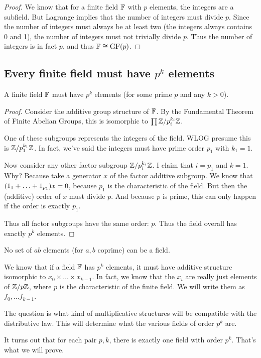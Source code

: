 \begin{proof}
  We know that for a finite field $\mathbb{F}$ with $p$ elements, the
  integers are a subfield. But Lagrange implies that the number of
  integers must divide $p$. Since the number of integers must always be
  at least two (the integers always contains 0 and 1), the number of
  integers must not trivially divide $p$. Thus the number of integers is
  in fact $p$, and thus $\mathbb{F} \cong \operatorname{GF}\mathopen{}\left( {p} \right)\mathclose{}$.
\end{proof}

\subsection{Every finite field must have $p^k$ elements}

\begin{theorem}
  A finite field $\mathbb{F}$ must have $p^k$ elements (for some prime $p$ and
  any $k > 0$).
\end{theorem}

\begin{proof}
  Consider the additive group structure of $\mathbb{F}$. By the Fundamental
  Theorem of Finite Abelian Groups, this is isomorphic to $\prod
  \mathbb{Z} / p_i^{k_i}\mathbb{Z}$.

  One of these subgroups represents the integers of the field. WLOG
  presume this is $\mathbb{Z} / p_1^{k_1}\mathbb{Z}$. In fact, we've said the integers
  must have prime order $p_1$ with $k_1 = 1$.

  Now consider any other factor subgroup $\mathbb{Z} / p_i^{k_i}\mathbb{Z}$. I claim
  that $i = p_1$ and $k = 1$. Why? Because take a generator $x$ of the
  factor additive subgroup. We know that $\mathopen{}\left( {1_1 + \ldots +
  1_{p_1}} \right)\mathclose{} x = 0$, because $p_1$ is the characteristic of the field. But
  then the (additive) order of $x$ must divide $p$. And because $p$ is
  prime, this can only happen if the order is exactly $p_1$.

  Thus all factor subgroups have the same order: $p$. Thus the field
  overall has exactly $p^k$ elements.
\end{proof}

\begin{corollary}
  No set of $ab$ elements (for $a, b$ coprime) can be a field.
\end{corollary}

\begin{remark}
  We know that if a field $\mathbb{F}$ has $p^k$ elements, it must have additive
  structure isomorphic to $x_0 \times \ldots \times x_{k-1}$. In fact,
  we know that the $x_i$ are really just elements of $\mathbb{Z} / p\mathbb{Z}$, where $p$
  is the characteristic of the finite field. We will write them as $f_0,
  \ldots f_{k-1}$.

  The question is what kind of multiplicative structures will be
  compatible with the distributive law. This will determine what the
  various fields of order $p^k$ are.

  It turns out that for each pair $p, k$, there is exactly one field
  with order $p^k$. That's what we will prove.
\end{remark}

